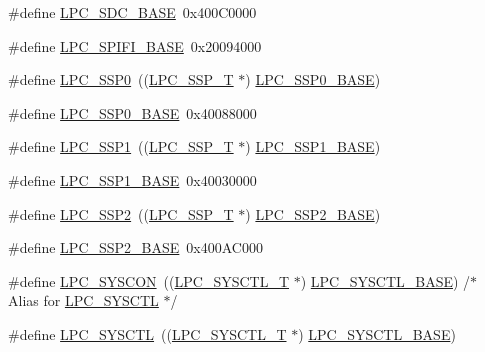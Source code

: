 \begin{DoxyCompactItemize}
\#define \hyperlink{group__PERIPH__177X__8X__BASE_gab8f044e5911a6bf51879e4614bf2a0a3}{L\+P\+C\+\_\+\+S\+D\+C\+\_\+\+B\+A\+SE}~0x400\+C0000
\item 
\#define \hyperlink{group__PERIPH__177X__8X__BASE_gad284a5971366e0a8b5fe9881fdb9aa0c}{L\+P\+C\+\_\+\+S\+P\+I\+F\+I\+\_\+\+B\+A\+SE}~0x20094000
\item 
\#define \hyperlink{group__PERIPH__177X__8X__BASE_gac213e0325a8e8a972bd2e0dd6ccf353c}{L\+P\+C\+\_\+\+S\+S\+P0}~((\hyperlink{structLPC__SSP__T}{L\+P\+C\+\_\+\+S\+S\+P\+\_\+T}              $\ast$) \hyperlink{group__PERIPH__407X__8X__BASE_ga53fb1af80b541545988f2a966681abfd}{L\+P\+C\+\_\+\+S\+S\+P0\+\_\+\+B\+A\+SE})
\item 
\#define \hyperlink{group__PERIPH__177X__8X__BASE_ga53fb1af80b541545988f2a966681abfd}{L\+P\+C\+\_\+\+S\+S\+P0\+\_\+\+B\+A\+SE}~0x40088000
\item 
\#define \hyperlink{group__PERIPH__177X__8X__BASE_ga09c4610ada1d9aa18913963cbd1a6e52}{L\+P\+C\+\_\+\+S\+S\+P1}~((\hyperlink{structLPC__SSP__T}{L\+P\+C\+\_\+\+S\+S\+P\+\_\+T}              $\ast$) \hyperlink{group__PERIPH__407X__8X__BASE_ga05d118997f53f596d3a087f8b91a1969}{L\+P\+C\+\_\+\+S\+S\+P1\+\_\+\+B\+A\+SE})
\item 
\#define \hyperlink{group__PERIPH__177X__8X__BASE_ga05d118997f53f596d3a087f8b91a1969}{L\+P\+C\+\_\+\+S\+S\+P1\+\_\+\+B\+A\+SE}~0x40030000
\item 
\#define \hyperlink{group__PERIPH__177X__8X__BASE_ga1e342299e20b4a502b4c71d292fc8eeb}{L\+P\+C\+\_\+\+S\+S\+P2}~((\hyperlink{structLPC__SSP__T}{L\+P\+C\+\_\+\+S\+S\+P\+\_\+T}              $\ast$) \hyperlink{group__PERIPH__407X__8X__BASE_ga1460d4b0a86fa00b3d3ef8abd21abbc1}{L\+P\+C\+\_\+\+S\+S\+P2\+\_\+\+B\+A\+SE})
\item 
\#define \hyperlink{group__PERIPH__177X__8X__BASE_ga1460d4b0a86fa00b3d3ef8abd21abbc1}{L\+P\+C\+\_\+\+S\+S\+P2\+\_\+\+B\+A\+SE}~0x400\+A\+C000
\item 
\#define \hyperlink{group__PERIPH__177X__8X__BASE_gabe45c10a979fe812e3d9ecd72fe33a2f}{L\+P\+C\+\_\+\+S\+Y\+S\+C\+ON}~((\hyperlink{structLPC__SYSCTL__T}{L\+P\+C\+\_\+\+S\+Y\+S\+C\+T\+L\+\_\+T}           $\ast$) \hyperlink{group__PERIPH__407X__8X__BASE_gae4670b50fe27772fa31de1da10bec7b7}{L\+P\+C\+\_\+\+S\+Y\+S\+C\+T\+L\+\_\+\+B\+A\+SE}) /$\ast$ Alias for \hyperlink{group__PERIPH__407X__8X__BASE_ga30cc92eba86b30295b3dcf3da503b736}{L\+P\+C\+\_\+\+S\+Y\+S\+C\+TL} $\ast$/
\item 
\#define \hyperlink{group__PERIPH__177X__8X__BASE_ga30cc92eba86b30295b3dcf3da503b736}{L\+P\+C\+\_\+\+S\+Y\+S\+C\+TL}~((\hyperlink{structLPC__SYSCTL__T}{L\+P\+C\+\_\+\+S\+Y\+S\+C\+T\+L\+\_\+T}           $\ast$) \hyperlink{group__PERIPH__407X__8X__BASE_gae4670b50fe27772fa31de1da10bec7b7}{L\+P\+C\+\_\+\+S\+Y\+S\+C\+T\+L\+\_\+\+B\+A\+SE})

\end{DoxyCompactItemize}
